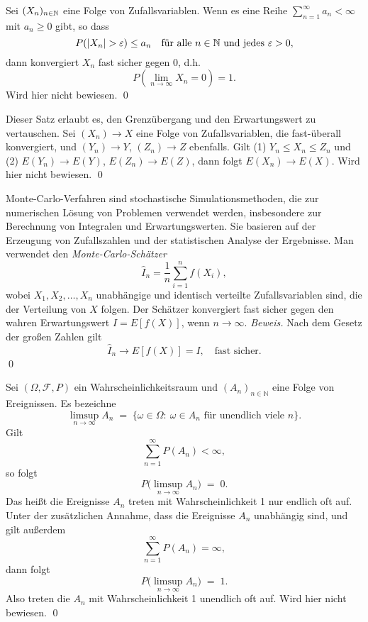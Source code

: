 \begin{lemma}\label{lemma:reihenkriterium}
Sei $(X_n)_{n \in \Bbb N}$ eine Folge von Zufallsvariablen. Wenn es eine Reihe $\sum_{n=1}^\infty a_n \lt \infty$ mit $a_n \geq 0$ gibt, so dass
$$P(|X_n| > \varepsilon) \leq a_n \quad \text{für alle } n \in \Bbb N \text{ und jedes } \varepsilon > 0,$$
dann konvergiert $X_n$ fast sicher gegen $0$, d.h.
$$P\left(\lim_{n \to \infty} X_n = 0\right) = 1.$$
Wird hier nicht bewiesen. \qed
\end{lemma}

\begin{satz}\label{satz:pratt}
Dieser Satz erlaubt es, den Grenzübergang und den Erwartungswert zu vertauschen.
Sei $(X_n) \longrightarrow X$ eine Folge von Zufallsvariablen, die fast-überall konvergiert,
und $(Y_n) \longrightarrow Y$, $(Z_n) \longrightarrow Z$ ebenfalls.
Gilt (1) $Y_n \le X_n \le Z_n$ und (2) $E(Y_n) \longrightarrow E(Y)$, $E(Z_n) \longrightarrow E(Z)$,
dann folgt $E(X_n) \longrightarrow E(X)$. Wird hier nicht bewiesen. \qed
\end{satz}

\begin{defprop}\label{def:monte_carlo}
Monte-Carlo-Verfahren sind stochastische Simulationsmethoden, die zur numerischen
Lösung von Problemen verwendet werden, insbesondere zur Berechnung von Integralen
und Erwartungswerten. Sie basieren auf der Erzeugung von Zufallszahlen und
der statistischen Analyse der Ergebnisse. Man verwendet den \textit{Monte-Carlo-Schätzer}
$$
\hat{I}_n = \frac{1}{n} \sum_{i=1}^n f(X_i),
$$
wobei $X_1, X_2, \ldots, X_n$ unabhängige und identisch verteilte Zufallsvariablen
sind, die der Verteilung von $X$ folgen. Der Schätzer konvergiert fast sicher
gegen den wahren Erwartungswert $I = E[f(X)]$, wenn $n \to \infty$.
\textit{Beweis.} Nach dem Gesetz der großen Zahlen gilt
$$\hat{I}_n \longrightarrow E[f(X)] = I, \quad \text{fast sicher.}$$ \qed
\end{defprop}

\begin{satz}\label{satz:borel_cantelli}
Sei $(\Omega,\mathcal F, P)$ ein Wahrscheinlichkeitsraum und $(A_n)_{n\in\mathbb N}$ eine Folge von Ereignissen. Es bezeichne
$$
\limsup_{n\to\infty} A_n \;=\; \{\omega\in\Omega:\ \omega\in A_n\text{ für unendlich viele }n\}.
$$
Gilt
$$
\sum_{n=1}^\infty P(A_n) < \infty,
$$
so folgt
$$
P\bigl(\limsup_{n\to\infty} A_n\bigr) \;=\; 0.
$$
Das heißt die Ereignisse $A_n$ treten mit Wahrscheinlichkeit 1 nur endlich oft auf. Unter der zusätzlichen Annahme, dass die Ereignisse $A_n$ unabhängig sind, und gilt außerdem
$$\sum_{n=1}^\infty P(A_n) = \infty,$$
dann folgt
$$
P\bigl(\limsup_{n\to\infty} A_n\bigr) \;=\; 1.
$$
Also treten die $A_n$ mit Wahrscheinlichkeit 1 unendlich oft auf. Wird hier nicht bewiesen. \qed
\end{satz}

